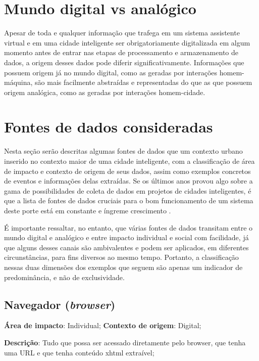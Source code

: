 \section{Mundo digital vs analógico}

Apesar de toda e qualquer informação que trafega em um sistema assistente virtual e em uma cidade inteligente ser obrigatoriamente digitalizada em algum momento antes de entrar nas etapas de processamento e armazenamento de dados, a origem desses dados pode diferir significativamente. Informações que possuem origem já no mundo digital, como as geradas por interações homem-máquina, são mais facilmente abstraídas e representadas do que as que possuem origem analógica, como as geradas por interações homem-cidade.

\section{Fontes de dados consideradas}

Nesta seção serão descritas algumas fontes de dados que um contexto urbano inserido no contexto maior de uma cidade inteligente, com a classificação de área de impacto e contexto de origem de seus dados, assim como exemplos concretos de eventos e informações delas extraídas. Se os últimos anos provou algo sobre a gama de possibilidades de coleta de dados em projetos de cidades inteligentes, é que a lista de fontes de dados cruciais para o bom funcionamento de um sistema deste porte está em constante e íngreme crescimento \cite{lavaprotocols:smartcity}.

É importante ressaltar, no entanto, que várias fontes de dados transitam entre o mundo digital e analógico e entre impacto individual e social com facilidade, já que alguns desses canais são ambivalentes e podem ser aplicados, em diferentes circunstâncias, para fins diversos ao mesmo tempo. Portanto, a classificação nessas duas dimensões dos exemplos que seguem são apenas um indicador de predominância, e não de exclusividade.

\subsection{Navegador (\textit{browser})}

\textbf{Área de impacto}: Individual; \textbf{Contexto de origem}: Digital;

\textbf{Descrição}: Tudo que possa ser acessado diretamente pelo browser, que tenha uma URL e que tenha conteúdo xhtml extraível;


